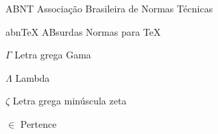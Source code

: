 \documentclass[12pt,oneside,a4paper,chapter=TITLE,english,brazil]{abntex2}
\begin{document}
\listoffigures*
\cleardoublepage


\listoftables*
\cleardoublepage






\begin{siglas}
  \item[ABNT] Associação Brasileira de Normas Técnicas
  \item[abnTeX] ABsurdas Normas para TeX
\end{siglas}


\begin{simbolos}
  \item[$\Gamma$] Letra grega Gama
  \item[$\Lambda$] Lambda
  \item[$\zeta$] Letra grega minúscula zeta
  \item[$ \in $] Pertence
\end{simbolos}
\end{document}
